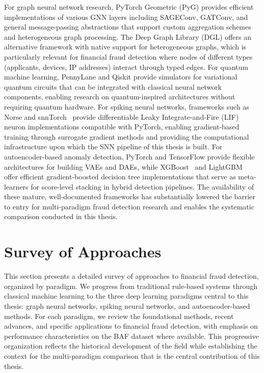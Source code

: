 For graph neural network research, PyTorch Geometric (PyG) provides efficient
implementations of various GNN layers including SAGEConv, GATConv, and general
message-passing abstractions that support custom aggregation schemes and
heterogeneous graph processing. The Deep Graph Library (DGL) offers an
alternative framework with native support for heterogeneous graphs, which is
particularly relevant for financial fraud detection where nodes of different
types (applicants, devices, IP addresses) interact through typed edges. For
quantum machine learning, PennyLane and Qiskit provide simulators for
variational quantum circuits that can be integrated with classical neural
network components, enabling research on quantum-inspired architectures without
requiring quantum hardware. For spiking neural networks, frameworks such as
Norse and snnTorch~\cite{eshraghian2021training} provide differentiable Leaky
Integrate-and-Fire (LIF) neuron implementations compatible with PyTorch,
enabling gradient-based training through surrogate gradient methods and
providing the computational infrastructure upon which the SNN pipeline of this
thesis is built. For autoencoder-based anomaly detection, PyTorch and TensorFlow
provide flexible architectures for building VAEs and DAEs, while
XGBoost~\cite{chen2016xgboost} and LightGBM~\cite{ke2017lightgbm} offer
efficient gradient-boosted decision tree implementations that serve as meta-
learners for score-level stacking in hybrid detection pipelines. The
availability of these mature, well-documented frameworks has substantially
lowered the barrier to entry for multi-paradigm fraud detection research and
enables the systematic comparison conducted in this thesis.

\section{Survey of Approaches}

This section presents a detailed survey of approaches to financial fraud
detection, organized by paradigm. We progress from traditional rule-based
systems through classical machine learning to the three deep learning paradigms
central to this thesis: graph neural networks, spiking neural networks, and
autoencoder-based methods. For each paradigm, we review the foundational
methods, recent advances, and specific applications to financial fraud
detection, with emphasis on performance characteristics on the BAF dataset where
available. This progressive organization reflects the historical development of
the field while establishing the context for the multi-paradigm comparison that
is the central contribution of this thesis.

